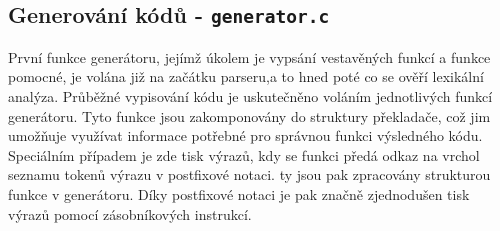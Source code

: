 \documentclass[czech,a4paper,12pt]{article}[]
\begin{document}
\newpage
\subsection{Generování kódů - \texttt{generator.c}}
První funkce generátoru, jejímž úkolem je vypsání vestavěných funkcí a funkce pomocné, je
volána již na začátku parseru,a to hned poté co se ověří lexikální analýza. Průběžné
vypisování kódu je uskutečněno voláním jednotlivých funkcí generátoru. Tyto funkce jsou
zakomponovány do struktury překladače, což jim umožňuje využívat informace potřebné pro
správnou funkci výsledného kódu. Speciálním případem je zde tisk výrazů, kdy se funkci
předá odkaz na vrchol seznamu tokenů výrazu v postfixové notaci. ty jsou pak zpracovány
strukturou funkce v generátoru. Díky postfixové notaci je pak značně zjednodušen tisk
výrazů pomocí zásobníkových instrukcí.
\newpage
\end{document}
